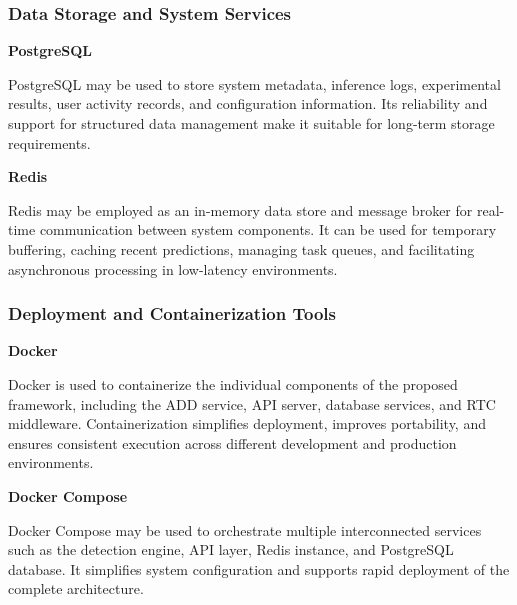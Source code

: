 \subsubsection{Data Storage and System Services}
\vspace{0.5cm}
\textbf{PostgreSQL}

PostgreSQL may be used to store system metadata, inference logs, experimental results, user activity records, and configuration information. Its reliability and support for structured data management make it suitable for long-term storage requirements.

\textbf{Redis}

Redis may be employed as an in-memory data store and message broker for real-time communication between system components. It can be used for temporary buffering, caching recent predictions, managing task queues, and facilitating asynchronous processing in low-latency environments.


\subsubsection{Deployment and Containerization Tools}
\vspace{0.5cm}
\textbf{Docker}

Docker is used to containerize the individual components of the proposed framework, including the ADD service, API server, database services, and RTC middleware. Containerization simplifies deployment, improves portability, and ensures consistent execution across different development and production environments.

\textbf{Docker Compose}

Docker Compose may be used to orchestrate multiple interconnected services such as the detection engine, API layer, Redis instance, and PostgreSQL database. It simplifies system configuration and supports rapid deployment of the complete architecture.

